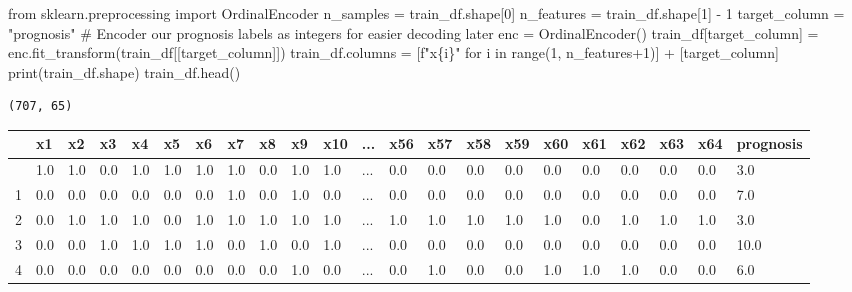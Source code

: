 \documentclass[
  letterpaper,
  DIV=11,
  numbers=noendperiod]{scrreprt}
\newenvironment{Shaded}{\begin{snugshade}}{\end{snugshade}}
\newcommand{\BuiltInTok}[1]{\textcolor[rgb]{0.00,0.23,0.31}{#1}}
\newcommand{\CommentTok}[1]{\textcolor[rgb]{0.37,0.37,0.37}{#1}}
\newcommand{\ControlFlowTok}[1]{\textcolor[rgb]{0.00,0.23,0.31}{#1}}
\newcommand{\DecValTok}[1]{\textcolor[rgb]{0.68,0.00,0.00}{#1}}
\newcommand{\ImportTok}[1]{\textcolor[rgb]{0.00,0.46,0.62}{#1}}
\newcommand{\KeywordTok}[1]{\textcolor[rgb]{0.00,0.23,0.31}{#1}}
\newcommand{\NormalTok}[1]{\textcolor[rgb]{0.00,0.23,0.31}{#1}}
\newcommand{\OperatorTok}[1]{\textcolor[rgb]{0.37,0.37,0.37}{#1}}
\newcommand{\SpecialCharTok}[1]{\textcolor[rgb]{0.37,0.37,0.37}{#1}}
\newcommand{\SpecialStringTok}[1]{\textcolor[rgb]{0.13,0.47,0.30}{#1}}
\newcommand{\StringTok}[1]{\textcolor[rgb]{0.13,0.47,0.30}{#1}}
\begin{document}
\begin{Shaded}
\begin{Highlighting}[]
\ImportTok{from}\NormalTok{ sklearn.preprocessing }\ImportTok{import}\NormalTok{ OrdinalEncoder}
\NormalTok{n\_samples }\OperatorTok{=}\NormalTok{ train\_df.shape[}\DecValTok{0}\NormalTok{]}
\NormalTok{n\_features }\OperatorTok{=}\NormalTok{ train\_df.shape[}\DecValTok{1}\NormalTok{] }\OperatorTok{{-}} \DecValTok{1}
\NormalTok{target\_column }\OperatorTok{=} \StringTok{"prognosis"}
\CommentTok{\# Encoder our prognosis labels as integers for easier decoding later}
\NormalTok{enc }\OperatorTok{=}\NormalTok{ OrdinalEncoder()}
\NormalTok{train\_df[target\_column] }\OperatorTok{=}\NormalTok{ enc.fit\_transform(train\_df[[target\_column]])}
\NormalTok{train\_df.columns }\OperatorTok{=}\NormalTok{ [}\SpecialStringTok{f"x}\SpecialCharTok{\{}\NormalTok{i}\SpecialCharTok{\}}\SpecialStringTok{"} \ControlFlowTok{for}\NormalTok{ i }\KeywordTok{in} \BuiltInTok{range}\NormalTok{(}\DecValTok{1}\NormalTok{, n\_features}\OperatorTok{+}\DecValTok{1}\NormalTok{)] }\OperatorTok{+}\NormalTok{ [target\_column]}
\BuiltInTok{print}\NormalTok{(train\_df.shape)}
\NormalTok{train\_df.head()}
\end{Highlighting}
\end{Shaded}

\begin{verbatim}
(707, 65)
\end{verbatim}

\begin{longtable}[]{@{}llllllllllllllllllllll@{}}
\toprule\noalign{}
& x1 & x2 & x3 & x4 & x5 & x6 & x7 & x8 & x9 & x10 & ... & x56 & x57 &
x58 & x59 & x60 & x61 & x62 & x63 & x64 & prognosis \\
\midrule\noalign{}
\endhead
\bottomrule\noalign{}
\endlastfoot
0 & 1.0 & 1.0 & 0.0 & 1.0 & 1.0 & 1.0 & 1.0 & 0.0 & 1.0 & 1.0 & ... &
0.0 & 0.0 & 0.0 & 0.0 & 0.0 & 0.0 & 0.0 & 0.0 & 0.0 & 3.0 \\
1 & 0.0 & 0.0 & 0.0 & 0.0 & 0.0 & 0.0 & 1.0 & 0.0 & 1.0 & 0.0 & ... &
0.0 & 0.0 & 0.0 & 0.0 & 0.0 & 0.0 & 0.0 & 0.0 & 0.0 & 7.0 \\
2 & 0.0 & 1.0 & 1.0 & 1.0 & 0.0 & 1.0 & 1.0 & 1.0 & 1.0 & 1.0 & ... &
1.0 & 1.0 & 1.0 & 1.0 & 1.0 & 0.0 & 1.0 & 1.0 & 1.0 & 3.0 \\
3 & 0.0 & 0.0 & 1.0 & 1.0 & 1.0 & 1.0 & 0.0 & 1.0 & 0.0 & 1.0 & ... &
0.0 & 0.0 & 0.0 & 0.0 & 0.0 & 0.0 & 0.0 & 0.0 & 0.0 & 10.0 \\
4 & 0.0 & 0.0 & 0.0 & 0.0 & 0.0 & 0.0 & 0.0 & 0.0 & 1.0 & 0.0 & ... &
0.0 & 1.0 & 0.0 & 0.0 & 1.0 & 1.0 & 1.0 & 0.0 & 0.0 & 6.0 \\
\end{longtable}
\end{document}
